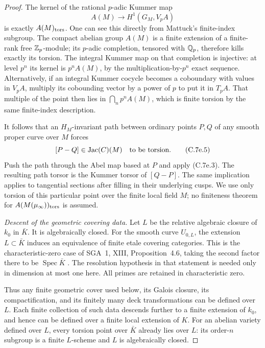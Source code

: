 \begin{proof}
The kernel of the rational $p$-adic Kummer map
\[
                    A(M)\longrightarrow H^1(G_M,V_pA)
\]
is exactly $A(M)_{\rm tors}$. One can see this directly from
Mattuck's finite-index subgroup. The compact abelian group
$A(M)$ is a finite extension of a finite-rank free $\mathbb Z_p$-module;
its $p$-adic completion, tensored with $\mathbb Q_p$, therefore kills
exactly its torsion. The integral Kummer map on that completion
is injective: at level $p^n$ its kernel is $p^n A(M)$, by the
multiplication-by-$p^n$ exact sequence. Alternatively, if an
integral Kummer cocycle becomes a coboundary with values in
$V_pA$, multiply its cobounding vector by a power of $p$ to
put it in $T_pA$. That multiple of the point then lies in
$\bigcap_n p^n A(M)$, which is finite torsion by the same
finite-index description.

It follows that an $H_M$-invariant path between ordinary points
$P,Q$ of any smooth proper curve over $M$ forces
\[
                       [P-Q]\in\operatorname{Jac}(C)(M)
                                \quad\hbox{to be torsion}.    \tag{C.7e.5}
\]
Push the path through the Abel map based at $P$ and apply
(C.7e.3). The resulting path torsor is the Kummer torsor of
$[Q-P]$. The same implication applies to tangential sections
after filling in their underlying cusps. We use only torsion
of this particular point over the finite local field $M$;
no finiteness theorem for $A(M(\mu_\infty))_{\rm tors}$ is
assumed.

\emph{Descent of the geometric covering data.}
Let $L$ be the relative algebraic closure of $k_0$ in $\bar K$.
It is algebraically closed. For the smooth curve $U_{0,L}$,
the extension $L\subset\bar K$ induces an equivalence of
finite etale covering categories. This is the characteristic-zero
case of SGA~1, XIII, Proposition~4.6, taking the second factor
there to be $\operatorname{Spec}\bar K$
\cite[XIII, Proposition~4.6, original pp.~421--422]{BC_SGA1}.
The resolution hypothesis in that statement is needed only in
dimension at most one here. All primes are retained in
characteristic zero.

Thus any finite geometric cover used below, its Galois closure,
its compactification, and its finitely many deck transformations
can be defined over $L$. Each finite collection of such data
descends further to a finite extension of $k_0$, and hence can
be defined over a finite local extension of $K$. For an abelian
variety defined over $L$, every torsion point over $\bar K$
already lies over $L$: its order-$n$ subgroup is a finite
$L$-scheme and $L$ is algebraically closed.


\end{proof}
